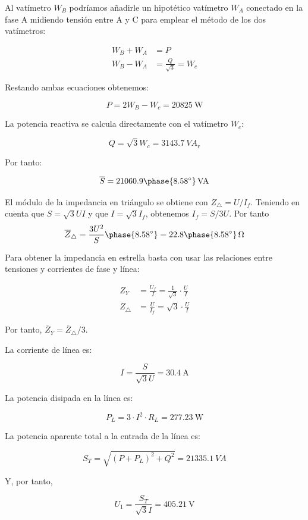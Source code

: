 \documentclass[12pt]{article}
\begin{document}
Al vatímetro $W_B$ podríamos añadirle un hipotético vatímetro
$W_A$ conectado en la fase A midiendo tensión entre A y C para
emplear el método de los dos vatímetros:


\begin{align*}
W_B + W_A &= P\\
W_B - W_A &= \frac{Q}{\sqrt{3}} = W_c
\end{align*}

Restando ambas ecuaciones obtenemos:

\[
  P = 2 W_B - W_c = \SI{20825}{\watt}
\]

La potencia reactiva se calcula directamente con el vatímetro $W_c$:

\[
  Q = \sqrt{3} W_c = \SI{3143.7}{VA}_r
\]

Por tanto:

\[
  \overline{S} =
  \SI[parse-numbers=false]{21060.9\phase{\ang{8.58}}}{VA}
\]

El módulo de la impedancia en triángulo se obtiene con
$Z_{\triangle} = U / I_f$. Teniendo en cuenta que $S = \sqrt{3} U I$
y que $I = \sqrt{3} I_f$, obtenemos $I_f = S / 3U$. Por tanto
\[
  \overline{Z}_{\triangle} = \frac{3 U^2}{S}\phase{\ang{8.58}} =
  \SI[parse-numbers=false]{22.8\phase{\ang{8.58}}}{\ohm}
\]


Para obtener la impedancia en estrella basta con usar las relaciones
entre tensiones y corrientes de fase y línea:

\begin{align*}
  Z_Y &= \frac{U_f}{I} = \frac{1}{\sqrt{3}} \cdot \frac{U}{I}\\
  Z_\triangle &= \frac{U}{I_f} = \sqrt{3} \cdot \frac{U}{I}
\end{align*}

Por tanto, $\overline{Z}_{Y} = \overline{Z}_{\triangle} / 3$.

La corriente de línea es:

\[
  I = \frac{S}{\sqrt{3} U} = \SI{30.4}{\ampere}
\]

La potencia disipada en la línea es:

\[
  P_L = 3 \cdot I^2 \cdot R_L = \SI{277.23}{\watt}
\]

La potencia aparente total a la entrada de la línea es:

\[
  S_T = \sqrt{(P + P_L)^2 + Q^2} = \SI{21335.1}{VA}
\]

Y, por tanto,

\[
  U_1 = \frac{S_T}{\sqrt{3} I} = \SI{405.21}{\volt}
\]
\end{document}
